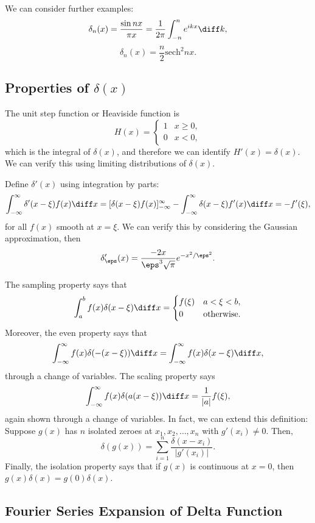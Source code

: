 \documentclass[12pt]{article}
\begin{document}
We can consider further examples:
\[
	\delta_n(x) = \frac{\sin n x}{\pi x} = \frac{1}{2 \pi} \int_{-n}^{n} e^{ikx}\diff k,
\]
\[
	\delta_n(x) = \frac{n}{2} \mathrm{sech}^2 nx
.\]

\subsection{Properties of \texorpdfstring{$\delta(x)$}{Delta function}}%
\label{sub:properties_of_delta_function}

The unit step function or Heaviside function is
\[
	H(x) =
	\begin{cases}
		1 & x \geq 0,\\
		0 & x < 0,
	\end{cases}
\]
which is the integral of $\delta(x)$, and therefore we can identify $H'(x) = \delta(x)$. We can verify this using limiting distributions of $\delta(x)$.

Define $\delta'(x)$ using integration by parts:
\[
	\int_{-\infty}^{\infty}\delta'(x -\xi)f(x)\diff x = [\delta(x-\xi)f(x)]_{-\infty}^{\infty} - \int_{-\infty}^{\infty}\delta(x - \xi)f'(x)\diff x = - f'(\xi)
,\]
for all $f(x)$ smooth at $x = \xi$. We can verify this by considering the Gaussian approximation, then
\[
	\delta_{\eps}'(x) = \frac{-2x}{\eps^3 \sqrt \pi}e^{-x^2/\eps^2}
.\]

The sampling property says that
\[
	\int_{a}^{b}f(x) \delta(x - \xi)\diff x =
	\begin{cases}
		f(\xi) & a < \xi < b, \\
		0 & \text{otherwise}.
	\end{cases}
\]
Moreover, the even property says that
\[
	\int_{-\infty}^{\infty}f(x) \delta(-(x-\xi))\diff x = \int_{-\infty}^{\infty}f(x) \delta(x - \xi) \diff x
,\]
through a change of variables. The scaling property says
\[
	\int_{-\infty}^{\infty}f(x) \delta(a(x - \xi)) \diff x = \frac{1}{|a|}f(\xi)
,\]
again shown through a change of variables. In fact, we can extend this definition: Suppose $g(x)$ has $n$ isolated zeroes at $x_1, x_2, \ldots, x_n$ with $g'(x_i) \neq 0$. Then,
\[
	\delta(g(x)) = \sum_{i = 1}^{n} \frac{\delta(x - x_i)}{|g'(x_i)|}
.\]
Finally, the isolation property says that if $g(x)$ is continuous at $x = 0$, then $g(x) \delta(x) = g(0) \delta(x)$.

\subsection{Fourier Series Expansion of Delta Function}%
\label{sub:fourier_series_expansion_of_delta_function}
\end{document}
